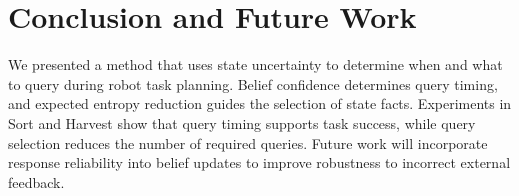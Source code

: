 \section{Conclusion and Future Work}
We presented a method that uses state uncertainty to determine when and what to query during robot task planning. Belief confidence determines query timing, and expected entropy reduction guides the selection of state facts. Experiments in Sort and Harvest show that query timing supports task success, while query selection reduces the number of required queries. Future work will incorporate response reliability into belief updates to improve robustness to incorrect external feedback.